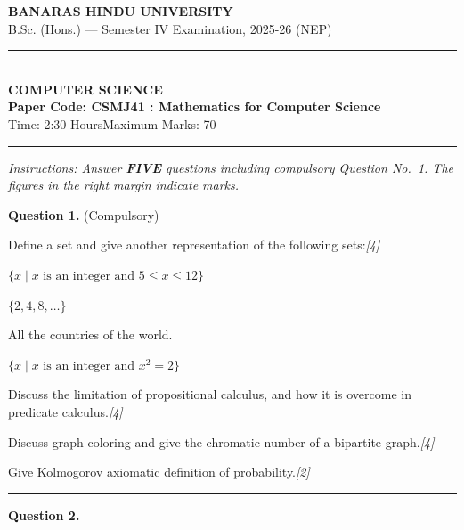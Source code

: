 \documentclass[11pt,a4paper]{article}
\newcommand{\pts}[1]{\hfill   \textit{[#1]}}
\begin{document}
\begin{center}
  {\large\bfseries BANARAS HINDU UNIVERSITY}\\[2pt]
  {\normalsize B.Sc. (Hons.) --- Semester IV Examination, 2025-26 (NEP)}\\[6pt]
  \rule{0.8\linewidth}{0.5pt}\\[6pt]
  {\large\bfseries COMPUTER SCIENCE}\\[4pt]
  {\large\bfseries Paper Code: CSMJ41 : Mathematics for Computer Science}\\[4pt]
  {\normalsize Time: 2:30 Hours\hfill Maximum Marks: 70}
\end{center}

\rule{\linewidth}{0.4pt}

\smallskip



\noindent   \textit{Instructions: Answer   \textbf{FIVE} questions including compulsory Question No.~1. The figures in the right margin indicate marks.}

\bigskip




\noindent   \textbf{Question 1.} (Compulsory)

\begin{parts}
  \item Define a set and give another representation of the following sets:\pts{4}
  
\begin{parts}
    \item $\{x \mid x  \text{ is an integer and } 5 \le x \le 12\}$
    \item $\{2, 4, 8, \dots\}$
    \item All the countries of the world.
    \item $\{x \mid x  \text{ is an integer and } x^2 = 2\}$
  \end{parts}
  \item Discuss the limitation of propositional calculus, and how it is overcome in predicate calculus.\pts{4}
  \item Discuss graph coloring and give the chromatic number of a bipartite graph.\pts{4}
  \item Give Kolmogorov axiomatic definition of probability.\pts{2}
\end{parts}

\medskip\rule{\linewidth}{0.2pt}\medskip




\noindent   \textbf{Question 2.}
\end{document}
